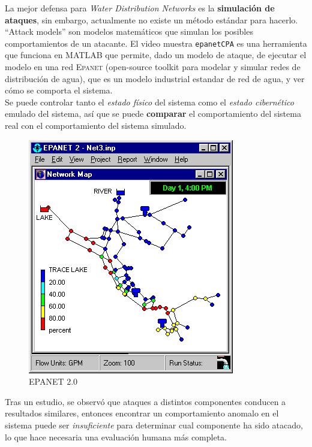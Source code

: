 \begin{paracol}{2}
   \colfill
   La mejor defensa para \textit{Water Distribution Networks} es la \textbf{simulación de ataques}, sin embargo, actualmente no existe un método estándar para hacerlo.
   ``Attack models'' son modelos matemáticos que simulan los posibles comportamientos de un atacante.
   El video muestra \texttt{epanetCPA} es una herramienta que funciona en MATLAB que permite, dado un modelo de ataque, de ejecutar el modelo en una red \textsc{Epanet} (open-source toolkit para modelar y simular redes de distribución de agua), que es un modelo industrial estandar de red de agua, y ver cómo se comporta el sistema.\\
   Se puede controlar tanto el \textit{estado físico} del sistema como el \textit{estado cibernético} emulado del sistema, así que se puede \textbf{comparar} el comportamiento del sistema real con el comportamiento del sistema simulado.
   \colfill
   \switchcolumn

   \begin{figure}[htbp]
      \centering
      \includegraphics{images/EPANET-8.png}
      \caption{EPANET 2.0}
      \label{fig:EPANET}
   \end{figure}
\end{paracol}
   Tras un estudio, se observó que ataques a distintos componentes conducen a resultados similares, entonces encontrar un comportamiento anomalo en el sistema puede ser \textit{insuficiente} para determinar cual componente ha sido atacado, lo que hace necesaria una evaluación humana más completa.